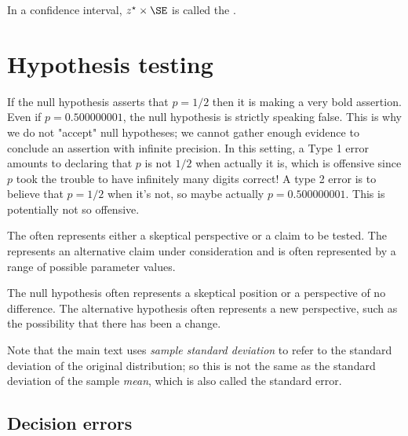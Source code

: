 \begin{termBox}{
\label{marginOfErrorTermBox}In a confidence interval, $z^{\star}\times \SE$ is called the .}
\end{termBox}


\section{Hypothesis testing}
\label{hypothesisTesting}



If the null hypothesis asserts that $p=1/2$ then it is making a very bold assertion. Even if $p=0.500000001$, the null hypothesis is strictly speaking false. This is why we do not "accept" null hypotheses; we cannot gather enough evidence to conclude an assertion with infinite precision. In this setting, a Type 1 error amounts to declaring that $p$ is not $1/2$ when actually it is, which is offensive since $p$ took the trouble to have infinitely many digits correct! A type 2 error is to believe that $p=1/2$ when it's not, so maybe actually $p=0.500000001$. This is potentially not so offensive.



\begin{termBox}{
{\small The  often represents either a skeptical perspective or a claim to be tested. The  represents an alternative claim under consideration and is often represented by a range of possible parameter values.}}
\end{termBox}

The null hypothesis often represents a skeptical position or a perspective of no difference. The alternative hypothesis often represents a new perspective, such as the possibility that there has been a change. 


Note that the main text uses \emph{sample standard deviation} to refer to the standard deviation of the original distribution; so this is not the same as the standard deviation of the sample \emph{mean}, which is also called the standard error.


\subsection{Decision errors}

